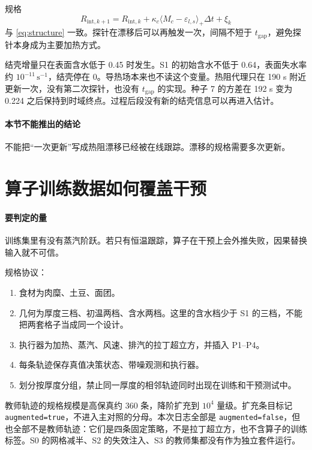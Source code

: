 规格
\begin{equation}
R_{\mathrm{int},k+1}=R_{\mathrm{int},k}+\kappa_c\langle M_c-\varepsilon_{l,s}\rangle_+\Delta t+\xi_k
\end{equation}
与 \eqref{eq:structure} 一致。探针在漂移后可以再触发一次，间隔不短于 \(t_{\mathrm{gap}}\)，避免探针本身成为主要加热方式。

结壳增量只在表面含水低于 0.45 时发生。S1 的初始含水不低于 0.64，表面失水率约 \(10^{-11}\,\mathrm{s}^{-1}\)，结壳停在 0。导热场本来也不读这个变量。热阻代理只在 190 s 附近更新一次，没有第二次探针，也没有 \(t_{\mathrm{gap}}\) 的实现。种子 7 的方差在 192 s 变为 0.224 之后保持到时域终点。过程后段没有新的结壳信息可以再进入估计。

\paragraph{本节不能推出的结论}
不能把“一次更新”写成热阻漂移已经被在线跟踪。漂移的规格需要多次更新。

\section{算子训练数据如何覆盖干预}

\paragraph{要判定的量}
训练集里有没有蒸汽阶跃。若只有恒温跟踪，算子在干预上会外推失败，因果替换输入就不可信。

规格协议：

\begin{enumerate}
\item 食材为肉糜、土豆、面团。
\item 几何为厚度三档、初温两档、含水两档。这里的含水档少于 S1 的三档，不能把两套格子当成同一个设计。
\item 执行器为加热、蒸汽、风速、排汽的拉丁超立方，并插入 P1--P4。
\item 每条轨迹保存真值决策状态、带噪观测和执行器。
\item 划分按厚度分组，禁止同一厚度的相邻轨迹同时出现在训练和干预测试中。
\end{enumerate}

教师轨迹的规格规模是高保真约 360 条，降阶扩充到 \(10^4\) 量级。扩充条目标记 \texttt{augmented=true}，不进入主对照的分母。本次日志全部是 \texttt{augmented=false}，但也全部不是教师轨迹：它们是四条固定策略，不是拉丁超立方，也不含算子的训练标签。S0 的网格减半、S2 的失效注入、S3 的教师集都没有作为独立套件运行。

